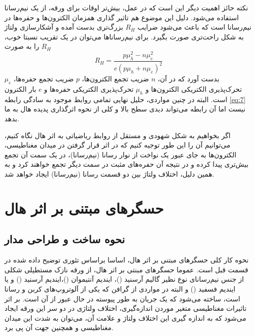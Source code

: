 \documentclass[conference]{IEEEtran-ModifiedForMVIP}
\begin{document}
نکته حائز اهمیت دیگر این است که  در عمل، بیش‌تر اوقات برای ورقه، از یک نیم‌رسانا استفاده می‌شود. دلیل این موضوع هم تاثیر گذاری همزمان الکترون‌ها و حفره‌ها در نیم‌رسانا است که باعث می‌شود ضرایب $R_H$ بزرگ‌تری بدست آمده و آشکارسازی ولتاژ به شکل راحت‌تری صورت بگیرد. برای نیم‌رسانا‌ها می‌توان در یک تقریب نسبتا خوب، $R_H$ را به صورت
\begin{equation}
	R_H = \frac{p \mu_h^2 - n \mu_e^2}{e(p\mu_h + n \mu_e)^2}
\end{equation}
بدست آورد که در آن، $n$ ضریب تجمع الکترون‌ها، $p$ ضریب تجمع حفره‌ها، $\mu_e$ تحرک‌پذیری الکتریکی الکترون‌ها و $\mu_h$ تحرک‌پذیری الکتریکی حفره‌ها و $e$ بار الکترون است. البته در چنین مواردی، حلیل نهایی تمامی روابط موجود به سادگی رابطه \eqref{eq:7} نیست اما آن رابطه می‌تواند دیدی سطح بالا و کلی از نحوه اثرگذاری پدیده هال به ما بدهد.
\cite{noauthor_hall_2021}


اگر بخواهیم به شکل  شهودی و مستقل از روابط ریاضیاتی به اثر هال نگاه کنیم، می‌توانیم آن را این طور توجیه کنیم که در اثر قرار گرفتن در میدان مغناطیسی، الکترون‌ها به جای عبور یک نواخت از نوار رسانا (نیم‌رسانا)، در یک سمت آن تجمع بیش‌تری پیدا کرده و در نتیجه آن حفره‌های مثبت در سمت دیگر تجمع خواهند کرد و به همین دلیل، اختلاف ولتاژ بین دو قسمت رسانا (نیم‌رسانا) ایجاد خواهد شد.


\section{حسگر‌های مبتنی بر اثر هال}
\subsection{نحوه ساخت و طراحی مدار}
 
 نحوه کار کلی حسگر‌های مبتنی بر اثر هال، اساسا براساس تئوری توضیح داده شده در قسمت قبل است. عموما حسگرهای مبنتی بر اثر هال، از ورقه نازک مستطیلی شکلی از جنس نیم‌رسانای نوع  نظیر گالیم آرسنید ()، ایندیم آنتیموان ()،ایندیم آرسنید () و یا ایندیم فسفید  () و البته در مواردی از گرافن که یکی از آلوتروپ‌های کربن و رسانا است، ساخته می‌شود که یک جریان به طور پیوسته در حال عبور از آن است. بر اثر تاثیرات مغناطیسی متغیر موردن اندازه‌گیری، اختلاف ولتاژی در دو سر این ورقه ایجاد می‌شود که به اندازه گیری این اختلاف ولتاژ و علامت آن، می‌توان به شدت این میدان مغناطیسی و همچنین جهت آن پی برد.
 \cite{wiki_sensor}
 
\end{document}
